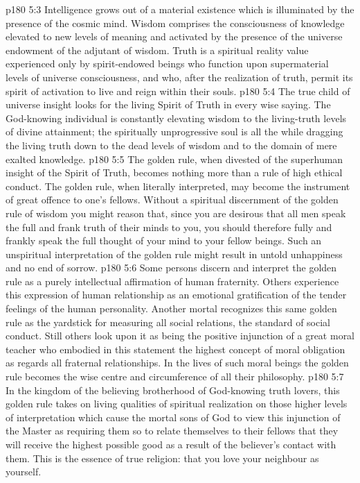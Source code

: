 \vs p180 5:3 Intelligence grows out of a material existence which is illuminated by the presence of the cosmic mind. Wisdom comprises the consciousness of knowledge elevated to new levels of meaning and activated by the presence of the universe endowment of the adjutant of wisdom. Truth is a spiritual reality value experienced only by spirit\hyp{}endowed beings who function upon supermaterial levels of universe consciousness, and who, after the realization of truth, permit its spirit of activation to live and reign within their souls.
\vs p180 5:4 The true child of universe insight looks for the living Spirit of Truth in every wise saying. The God\hyp{}knowing individual is constantly elevating wisdom to the living\hyp{}truth levels of divine attainment; the spiritually unprogressive soul is all the while dragging the living truth down to the dead levels of wisdom and to the domain of mere exalted knowledge.
\vs p180 5:5 The golden rule, when divested of the superhuman insight of the Spirit of Truth, becomes nothing more than a rule of high ethical conduct. The golden rule, when literally interpreted, may become the instrument of great offence to one’s fellows. Without a spiritual discernment of the golden rule of wisdom you might reason that, since you are desirous that all men speak the full and frank truth of their minds to you, you should therefore fully and frankly speak the full thought of your mind to your fellow beings. Such an unspiritual interpretation of the golden rule might result in untold unhappiness and no end of sorrow.
\vs p180 5:6 Some persons discern and interpret the golden rule as a purely intellectual affirmation of human fraternity. Others experience this expression of human relationship as an emotional gratification of the tender feelings of the human personality. Another mortal recognizes this same golden rule as the yardstick for measuring all social relations, the standard of social conduct. Still others look upon it as being the positive injunction of a great moral teacher who embodied in this statement the highest concept of moral obligation as regards all fraternal relationships. In the lives of such moral beings the golden rule becomes the wise centre and circumference of all their philosophy.
\vs p180 5:7 In the kingdom of the believing brotherhood of God\hyp{}knowing truth lovers, this golden rule takes on living qualities of spiritual realization on those higher levels of interpretation which cause the mortal sons of God to view this injunction of the Master as requiring them so to relate themselves to their fellows that they will receive the highest possible good as a result of the believer’s contact with them. This is the essence of true religion: that you love your neighbour as yourself.

